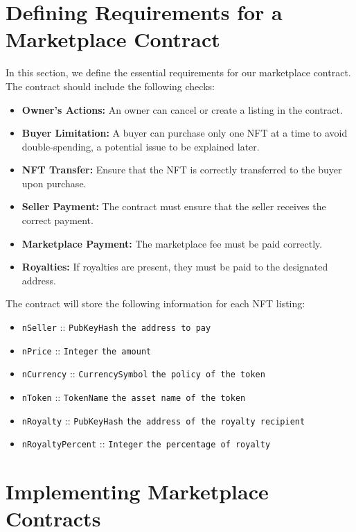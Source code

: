 \section{Defining Requirements for a Marketplace Contract}

In this section, we define the essential requirements for our marketplace contract. The contract should include the following checks:

\begin{itemize}
    \item \textbf{Owner's Actions:} An owner can cancel or create a listing in the contract.
    \item \textbf{Buyer Limitation:} A buyer can purchase only one NFT at a time to avoid double-spending, a potential issue to be explained later.
    \item \textbf{NFT Transfer:} Ensure that the NFT is correctly transferred to the buyer upon purchase.
    \item \textbf{Seller Payment:} The contract must ensure that the seller receives the correct payment.
    \item \textbf{Marketplace Payment:} The marketplace fee must be paid correctly.
    \item \textbf{Royalties:} If royalties are present, they must be paid to the designated address.
\end{itemize}

The contract will store the following information for each NFT listing:

\begin{itemize}
    \item \texttt{nSeller} :: \texttt{PubKeyHash} \texttt{the address to pay}
    \item \texttt{nPrice} :: \texttt{Integer} \texttt{the amount}
    \item \texttt{nCurrency} :: \texttt{CurrencySymbol} \texttt{the policy of the token}
    \item \texttt{nToken} :: \texttt{TokenName} \texttt{the asset name of the token}
    \item \texttt{nRoyalty} :: \texttt{PubKeyHash} \texttt{the address of the royalty recipient}
    \item \texttt{nRoyaltyPercent} :: \texttt{Integer} \texttt{the percentage of royalty}
\end{itemize}

\section{Implementing Marketplace Contracts}

